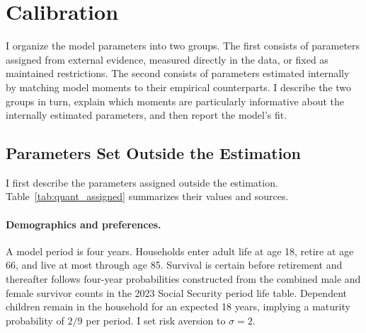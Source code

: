 
\section{Calibration}
\label{sec:quant_calibration}

I organize the model parameters into two groups. The first consists of
parameters assigned from external evidence, measured directly in the data, or
fixed as maintained restrictions. The second consists of parameters estimated
internally by matching model moments to their empirical counterparts. I describe
the two groups in turn, explain which moments are particularly informative
about the internally estimated parameters, and then report the model's fit.

\subsection{Parameters Set Outside the Estimation}

I first describe the parameters assigned outside the estimation. Table~\ref{tab:quant_assigned}
summarizes their values and sources.

\paragraph{Demographics and preferences.}
A model period is four years. Households enter adult life at age 18, retire at
age 66, and live at most through age 85. Survival is certain before retirement
and thereafter follows four-year probabilities constructed from the combined
male and female survivor counts in the 2023 Social Security period life table.
Dependent children remain in the household for an expected 18 years, implying
a maturity probability of $2/9$ per period. I set risk aversion to $\sigma=2$.

